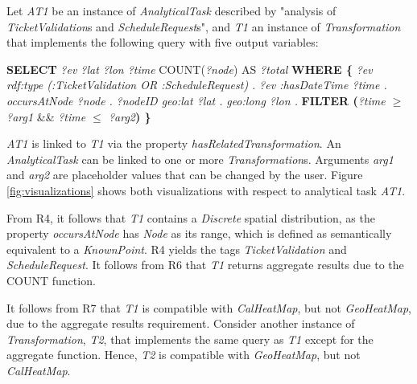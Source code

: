 \documentclass[]{interact}
\theoremstyle{plain}%
\theoremstyle{definition}
\theoremstyle{remark}
\theoremstyle{definition}
\begin{document}
Let \textit{AT1} be an instance of \textit{AnalyticalTask} described by "analysis of \textit{TicketValidation}s and \textit{ScheduleRequest}s", and \textit{T1} an instance of \textit{Transformation} that implements the following query with five output variables:

\begin{algorithmic}
  
 \label{alg:transformation1}

  \STATE \textbf{SELECT} \textit{?ev ?lat ?lon ?time} COUNT(\textit{?node}) AS \textit{?total}
  \STATE \textbf{WHERE \{}
  \STATE \hspace{5mm} \textit{?ev rdf:type (:TicketValidation OR :ScheduleRequest) .}
  \STATE \hspace{5mm} \textit{?ev :hasDateTime ?time .}
  \STATE \hspace{11mm} \textit{occursAtNode ?node .}
  \STATE \hspace{5mm} \textit{?nodeID geo:lat ?lat .}
  \STATE \hspace{18mm} \textit{geo:long ?lon .}
  \STATE \hspace{5mm} \textbf{FILTER (}\textit{?time $\geq$ ?arg1} \&\& \textit{?time $\leq$ ?arg2}\textbf{) \}}
\end{algorithmic}

\textit{AT1} is linked to \textit{T1} via the property \textit{hasRelatedTransformation}. An \textit{AnalyticalTask} can be linked to one or more \textit{Transformation}s. Arguments \textit{arg1} and \textit{arg2} are placeholder values that can be changed by the user. Figure \ref{fig:visualizations} shows both visualizations with respect to analytical task \textit{AT1}.

From R4, it follows that \textit{T1} contains a \textit{Discrete} spatial distribution, as the property \textit{occursAtNode} has \textit{Node} as its range, which is defined as semantically equivalent to a \textit{KnownPoint}. R4 yields the tags \textit{TicketValidation} and \textit{ScheduleRequest}. It follows from R6 that \textit{T1} returns aggregate results due to the COUNT function.

It follows from R7 that \textit{T1} is compatible with \textit{CalHeatMap}, but not \textit{GeoHeatMap}, due to the aggregate results requirement. Consider another instance of \textit{Transformation}, \textit{T2}, that implements the same query as \textit{T1} except for the aggregate function. Hence, \textit{T2} is compatible with \textit{GeoHeatMap}, but not \textit{CalHeatMap}.
\end{document}
